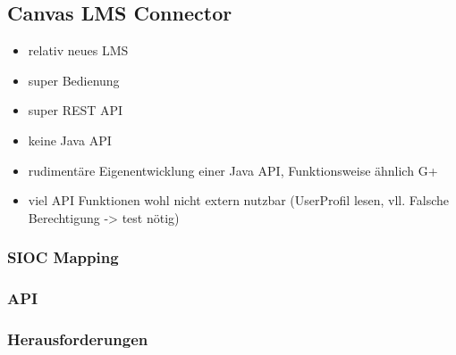 




\subsection{Canvas LMS Connector} %
\label{sub:canvas_lms_connector}

\begin{itemize}
    \item relativ neues LMS
    \item super Bedienung
    \item super REST API
    \item keine Java API
    \item rudimentäre Eigenentwicklung einer Java API, Funktionsweise ähnlich  G+
    \item viel API Funktionen wohl nicht extern nutzbar (UserProfil lesen, vll. Falsche Berechtigung -> test nötig)
\end{itemize}

\subsubsection{SIOC Mapping} %
\label{ssub:canvas_lms_sioc_mapping}

\subsubsection{API} %
\label{ssub:canvas_lms_api}

\subsubsection{Herausforderungen} %
\label{ssub:canvas_lms_herausforderungen}








